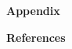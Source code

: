 \documentclass{amsart}
\theoremstyle{definition}
\begin{document}
\textbf{Appendix}











\textbf{References}

\end{document}
